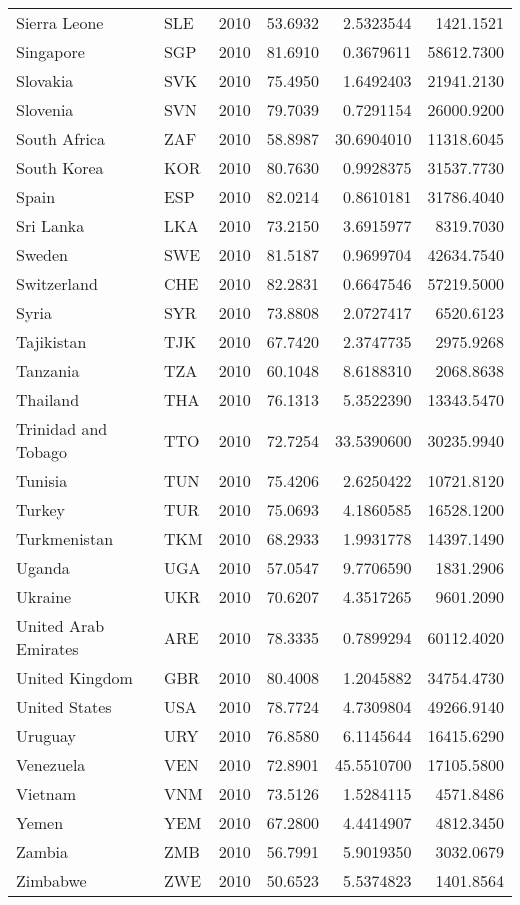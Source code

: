 \begin{longtable}[t]{llrrrr}
Sierra Leone & SLE & 2010 & 53.6932 & 2.5323544 & 1421.1521\\
Singapore & SGP & 2010 & 81.6910 & 0.3679611 & 58612.7300\\
Slovakia & SVK & 2010 & 75.4950 & 1.6492403 & 21941.2130\\
\addlinespace
Slovenia & SVN & 2010 & 79.7039 & 0.7291154 & 26000.9200\\
South Africa & ZAF & 2010 & 58.8987 & 30.6904010 & 11318.6045\\
South Korea & KOR & 2010 & 80.7630 & 0.9928375 & 31537.7730\\
Spain & ESP & 2010 & 82.0214 & 0.8610181 & 31786.4040\\
Sri Lanka & LKA & 2010 & 73.2150 & 3.6915977 & 8319.7030\\
\addlinespace
Sweden & SWE & 2010 & 81.5187 & 0.9699704 & 42634.7540\\
Switzerland & CHE & 2010 & 82.2831 & 0.6647546 & 57219.5000\\
Syria & SYR & 2010 & 73.8808 & 2.0727417 & 6520.6123\\
Tajikistan & TJK & 2010 & 67.7420 & 2.3747735 & 2975.9268\\
Tanzania & TZA & 2010 & 60.1048 & 8.6188310 & 2068.8638\\
\addlinespace
Thailand & THA & 2010 & 76.1313 & 5.3522390 & 13343.5470\\
Trinidad and Tobago & TTO & 2010 & 72.7254 & 33.5390600 & 30235.9940\\
Tunisia & TUN & 2010 & 75.4206 & 2.6250422 & 10721.8120\\
Turkey & TUR & 2010 & 75.0693 & 4.1860585 & 16528.1200\\
Turkmenistan & TKM & 2010 & 68.2933 & 1.9931778 & 14397.1490\\
\addlinespace
Uganda & UGA & 2010 & 57.0547 & 9.7706590 & 1831.2906\\
Ukraine & UKR & 2010 & 70.6207 & 4.3517265 & 9601.2090\\
United Arab Emirates & ARE & 2010 & 78.3335 & 0.7899294 & 60112.4020\\
United Kingdom & GBR & 2010 & 80.4008 & 1.2045882 & 34754.4730\\
United States & USA & 2010 & 78.7724 & 4.7309804 & 49266.9140\\
\addlinespace
Uruguay & URY & 2010 & 76.8580 & 6.1145644 & 16415.6290\\
Venezuela & VEN & 2010 & 72.8901 & 45.5510700 & 17105.5800\\
Vietnam & VNM & 2010 & 73.5126 & 1.5284115 & 4571.8486\\
Yemen & YEM & 2010 & 67.2800 & 4.4414907 & 4812.3450\\
Zambia & ZMB & 2010 & 56.7991 & 5.9019350 & 3032.0679\\
\addlinespace
Zimbabwe & ZWE & 2010 & 50.6523 & 5.5374823 & 1401.8564\\*
\end{longtable}
\endgroup{}